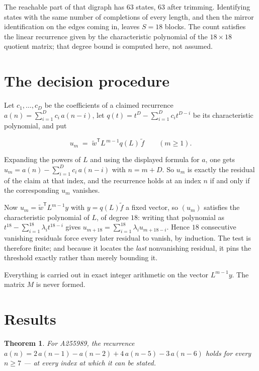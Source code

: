 \documentclass[11pt]{article}
\newtheorem{theorem}{Theorem}
\theoremstyle{definition}
\begin{document}
The reachable part of that digraph has $63$ states, $63$ after trimming. Identifying states with the same number of completions of every length, and then the mirror identification on the edges coming in, leaves $S = 18$ blocks. The count satisfies the linear recurrence given by the characteristic polynomial of the $18\times18$ quotient matrix; that degree bound is computed here, not assumed.

\section{The decision procedure}

Let $c_1,\dots,c_D$ be the coefficients of a claimed recurrence $a(n) = \sum_{i=1}^{D} c_i\,a(n-i)$, let $q(t) = t^{D} - \sum_{i=1}^{D} c_i t^{D-i}$ be its characteristic polynomial, and put

\[u_m \;=\; \tilde w^{\mathsf T} L^{\,m-1} q(L)\,\tilde f \qquad (m \ge 1).\]

Expanding the powers of $L$ and using the displayed formula for $a$, one gets $u_m = a(n) - \sum_{i=1}^{D} c_i\,a(n-i)$ with $n = m + D$. So $u_m$ is exactly the residual of the claim at that index, and the recurrence holds at an index $n$ if and only if the corresponding $u_m$ vanishes.

Now $u_m = \tilde w^{\mathsf T} L^{m-1} y$ with $y = q(L)\tilde f$ a fixed vector, so $(u_m)$ satisfies the characteristic polynomial of $L$, of degree $18$: writing that polynomial as $t^{18} - \sum_{i=1}^{18} \lambda_i t^{18-i}$ gives $u_{m+18} = \sum_{i=1}^{18} \lambda_i u_{m+18-i}$. Hence $18$ consecutive vanishing residuals force every later residual to vanish, by induction. The test is therefore finite; and because it locates the {\itshape last} nonvanishing residual, it pins the threshold exactly rather than merely bounding it.

Everything is carried out in exact integer arithmetic on the vector $L^{m-1}y$. The matrix $M$ is never formed.

\section{Results}

\begin{theorem} For A255989, the recurrence $a(n) = 2\,a(n-1) - a(n-2) + 4\,a(n-5) - 3\,a(n-6)$ holds for every $n \ge 7$ --- at every index at which it can be stated.\end{theorem}
\end{document}

